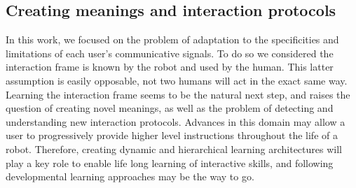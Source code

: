 

\subsection{Creating meanings and interaction protocols}



In this work, we focused on the problem of adaptation to the specificities and limitations of each user's communicative signals. To do so we considered the interaction frame is known by the robot and used by the human. This latter assumption is easily opposable, not two humans will act in the exact same way. Learning the interaction frame seems to be the natural next step, and raises the question of creating novel meanings, as well as the problem of detecting and understanding new interaction protocols. Advances in this domain may allow a user to progressively provide higher level instructions throughout the life of a robot. Therefore, creating dynamic and hierarchical learning architectures will play a key role to enable life long learning of interactive skills, and following developmental learning approaches may be the way to go.









